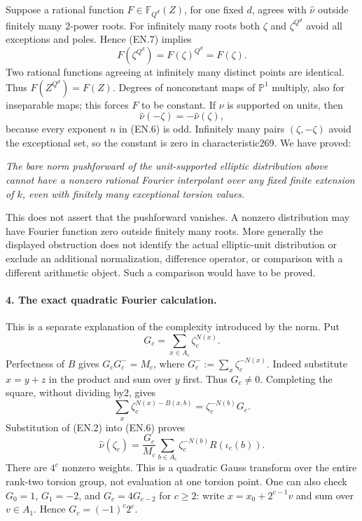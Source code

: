 Suppose a rational function $F\in\mathbb F_{Q^d}(Z)$, for one fixed
$d$, agrees with $\widehat\nu$ outside finitely many $2$-power roots.
For infinitely many roots both $\zeta$ and $\zeta^{Q^d}$ avoid all
exceptions and poles.  Hence (EN.7) implies
\[
 F(\zeta^{Q^d})=F(\zeta)^{Q^d}=F(\zeta).
\]
Two rational functions agreeing at infinitely many distinct points are
identical.  Thus $F(Z^{Q^d})=F(Z)$.  Degrees of nonconstant maps of
$\mathbb P^1$ multiply, also for inseparable maps; this forces $F$ to
be constant.  If $\nu$ is supported on units, then
\[
 \widehat\nu(-\zeta)=-\widehat\nu(\zeta),                    \tag{EN.8}
\]
because every exponent $n$ in (EN.6) is odd.  Infinitely many pairs
$(\zeta,-\zeta)$ avoid the exceptional set, so the constant is zero
in characteristic269.  We have proved:

\emph{The bare norm pushforward of the unit-supported elliptic
distribution above cannot have a nonzero rational Fourier interpolant
over any fixed finite extension of $k$, even with finitely many
exceptional torsion values.}

This does not assert that the pushforward vanishes.  A nonzero
distribution may have Fourier function zero outside finitely many
roots.  More generally the displayed obstruction does not identify
the actual elliptic-unit distribution or exclude an additional
normalization, difference operator, or comparison with a different
arithmetic object.  Such a comparison would have to be proved.

\paragraph{4. The exact quadratic Fourier calculation.}
This is a separate explanation of the complexity introduced by the
norm.  Put
\[
 G_c=\sum_{x\in A_c}\zeta_c^{N(x)}.
\]
Perfectness of $B$ gives
$G_cG_c^- =M_c$, where $G_c^-\!:=\sum_x\zeta_c^{-N(x)}$.
Indeed substitute $x=y+z$ in the product and sum over $y$ first.
Thus $G_c\ne0$.  Completing the square, without dividing by2, gives
\[
 \sum_x\zeta_c^{N(x)-B(x,b)}=\zeta_c^{-N(b)}G_c.
\]
Substitution of (EN.2) into (EN.6) proves
\[
 \widehat\nu(\zeta_c)=\frac{G_c}{M_c}
       \sum_{b\in A_c}\zeta_c^{-N(b)}R(\iota_c(b)).            \tag{EN.9}
\]
There are $4^c$ nonzero weights.  This is a quadratic Gauss transform
over the entire rank-two torsion group, not evaluation at one torsion
point.  One can also check $G_0=1$, $G_1=-2$, and
$G_c=4G_{c-2}$ for $c\geq2$: write $x=x_0+2^{c-1}v$ and sum over
$v\in A_1$.  Hence $G_c=(-1)^c2^c$.

